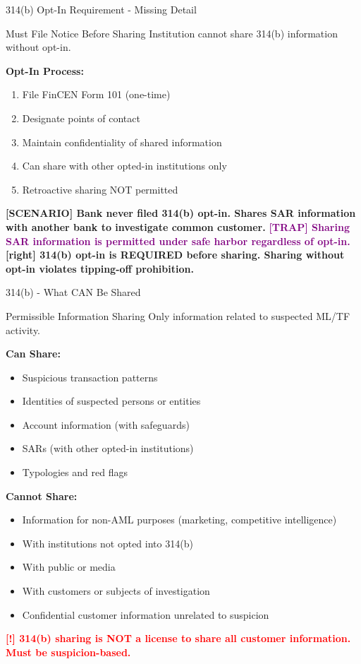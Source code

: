 \documentclass[11pt,a4paper]{beamer}
\newcommand{\redflag}[1]{\textcolor{red}{\textbf{[!] #1}}}
\newcommand{\trap}[1]{\textcolor{purple}{\textbf{[TRAP] #1}}}
\newcommand{\correct}[1]{\textcolor{green!50!black}{\textbf{[right] #1}}}
\newcommand{\scenario}[1]{\textcolor{blue!70!black}{\textbf{[SCENARIO] #1}}}
\begin{document}
\begin{frame}{314(b) Opt-In Requirement - Missing Detail}
\begin{block}{Must File Notice Before Sharing}
Institution cannot share 314(b) information without opt-in.
\end{block}
\textbf{Opt-In Process:}
\begin{enumerate}
\item File FinCEN Form 101 (one-time)
\item Designate points of contact
\item Maintain confidentiality of shared information
\item Can share with other opted-in institutions only
\item Retroactive sharing NOT permitted
\end{enumerate}
\scenario{Bank never filed 314(b) opt-in. Shares SAR information with another bank to investigate common customer.}
\trap{Sharing SAR information is permitted under safe harbor regardless of opt-in.}
\correct{314(b) opt-in is REQUIRED before sharing. Sharing without opt-in violates tipping-off prohibition.}
\end{frame}

\begin{frame}{314(b) - What CAN Be Shared}
\begin{block}{Permissible Information Sharing}
Only information related to suspected ML/TF activity.
\end{block}
\textbf{Can Share:}
\begin{itemize}
\item Suspicious transaction patterns
\item Identities of suspected persons or entities
\item Account information (with safeguards)
\item SARs (with other opted-in institutions)
\item Typologies and red flags
\end{itemize}
\textbf{Cannot Share:}
\begin{itemize}
\item Information for non-AML purposes (marketing, competitive intelligence)
\item With institutions not opted into 314(b)
\item With public or media
\item With customers or subjects of investigation
\item Confidential customer information unrelated to suspicion
\end{itemize}
\redflag{314(b) sharing is NOT a license to share all customer information. Must be suspicion-based.}
\end{frame}
\end{document}
